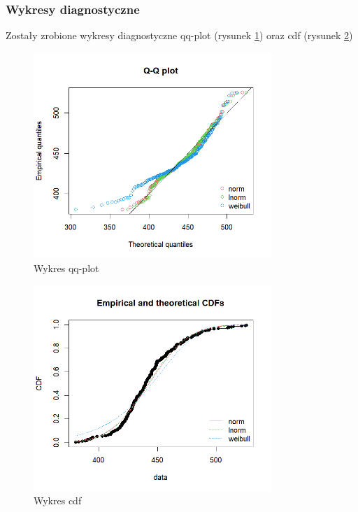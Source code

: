\documentclass[a4paper,11pt]{article}
\begin{document}
\subsubsection{Wykresy diagnostyczne}
Zostały zrobione wykresy diagnostyczne qq-plot (rysunek \ref{fig:qqplot}) oraz cdf (rysunek \ref{fig:cdf})

\begin{figure}[!htb]
  \centering
  \includegraphics[width=9cm]{images/qqplot.png}
  \caption{Wykres qq-plot}
  \label{fig:qqplot}
\end{figure}

\begin{figure}[!htb]
  \centering
  \includegraphics[width=9cm]{images/cdf.png}
  \caption{Wykres cdf}
  \label{fig:cdf}
\end{figure}
\end{document}
